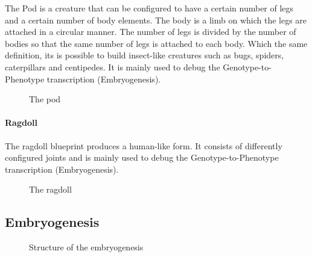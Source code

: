 \documentclass[main]{subfiles}
\begin{document}
The Pod is a creature that can be configured to have a certain number of legs and a certain number of body elements. The body is a limb on which the legs are attached in a circular manner. The number of legs is divided by the number of bodies so that the same number of legs is attached to each body. Which the same definition, its is possible to build insect-like creatures such as bugs, spiders, caterpillars and centipedes. It is mainly used to debug the Genotype-to-Phenotype transcription (Embryogenesis).

\begin{figure}[!h]
\centering
{}
\caption[The pod]{The pod}
\label{figure:pod}
\end{figure}


\paragraph{Ragdoll}

The ragdoll blueprint produces a human-like form. It consists of differently configured joints and is mainly used to debug the Genotype-to-Phenotype transcription (Embryogenesis).

\begin{figure}[!h]
\centering
{}
\caption[The ragdoll]{The ragdoll}
\label{figure:ragdoll}
\end{figure}


\subsection{Embryogenesis}

\begin{figure}[!h]
\centering
{}
\caption[Structure of the embryogenesis]{Structure of the embryogenesis}
\label{figure:embryogenesis}
\end{figure}
\end{document}

